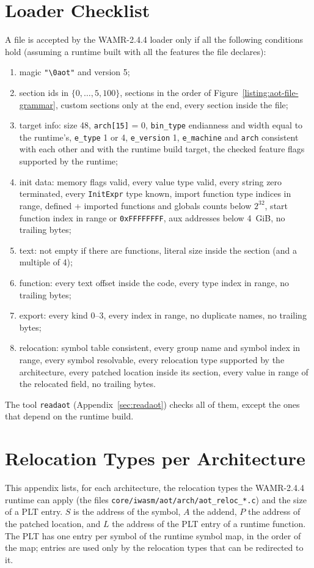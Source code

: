 \documentclass{article}
\begin{document}
\section{Loader Checklist}
\label{sec:checklist}
A file is accepted by the WAMR-2.4.4 loader only if all the following conditions hold (assuming a runtime built with all the features the file declares):
\begin{enumerate}
    \item magic \verb|"\0aot"| and version 5;
    \item section ids in $\{0,\dots,5,100\}$, sections in the order of Figure~\ref{listing:aot-file-grammar}, custom sections only at the end, every section inside the file;
    \item target info: size 48, \verb|arch[15]| = 0, \verb|bin_type| endianness and width equal to the runtime's, \verb|e_type| 1 or 4, \verb|e_version| 1, \verb|e_machine| and \verb|arch| consistent with each other and with the runtime build target, the checked feature flags supported by the runtime;
    \item init data: memory flags valid, every value type valid, every string zero terminated, every \verb|InitExpr| type known, import function type indices in range, defined + imported functions and globals counts below $2^{32}$, start function index in range or \verb|0xFFFFFFFF|, aux addresses below 4~GiB, no trailing bytes;
    \item text: not empty if there are functions, literal size inside the section (and a multiple of 4);
    \item function: every text offset inside the code, every type index in range, no trailing bytes;
    \item export: every kind 0--3, every index in range, no duplicate names, no trailing bytes;
    \item relocation: symbol table consistent, every group name and symbol index in range, every symbol resolvable, every relocation type supported by the architecture, every patched location inside its section, every value in range of the relocated field, no trailing bytes.
\end{enumerate}
The tool \texttt{readaot} (Appendix~\ref{sec:readaot}) checks all of them, except the ones that depend on the runtime build.

\appendix

\section{Relocation Types per Architecture}
\label{sec:reloc-arch}
This appendix lists, for each architecture, the relocation types the WAMR-2.4.4 runtime can apply (the files \texttt{core/iwasm/aot/arch/aot\_reloc\_*.c}) and the size of a PLT entry.
$S$ is the address of the symbol, $A$ the addend, $P$ the address of the patched location, and $L$ the address of the PLT entry of a runtime function.
The PLT has one entry per symbol of the runtime symbol map, in the order of the map; entries are used only by the relocation types that can be redirected to it.
\end{document}
